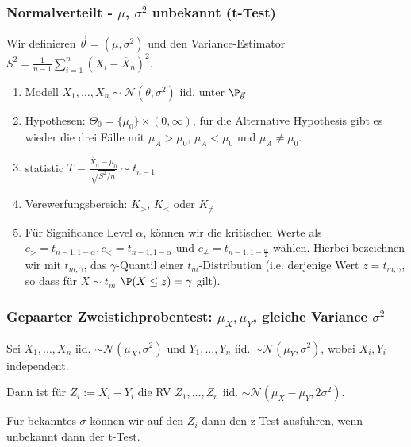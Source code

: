 \subsubsection*{\texorpdfstring{Normalverteilt - \(\mu\), \(\sigma^2\) unbekannt (t-Test)}{Normalverteilt - μ, σ² unbekannt (t-Test)}}
Wir definieren \(\vec{\theta} = (\mu, \sigma^2)\) und den Variance-Estimator \(S^2 = \frac{1}{n-1}\sum_{i=1}^n (X_i - \overline{X}_n)^2\).
\begin{enumerate}
	\item Modell \(X_1, \ldots, X_n \sim \mathcal{N}(\theta, \sigma^2)\) iid. unter \(\P_{\vec{\theta}}\)
	\item Hypothesen: $\Theta_0 = \{\mu_0\} \times (0, \infty)$, für die Alternative Hypothesis gibt es wieder die drei Fälle mit $\mu_A > \mu_0$, $\mu_A < \mu_0$ und $\mu_A \neq \mu_0$.
	\item statistic \(T = \frac{\overline{X}_n - \mu_0}{\sqrt{S^2/n}} \sim t_{n-1}\)
	\item Verewerfungsbereich: \(K_{>}\), \(K_{<}\) oder \(K_{\neq}\)
	\item Für Significance Level $\alpha$, können wir die kritischen Werte als $c_{>} = t_{n-1, 1-\alpha}, c_{<} = t_{n-1, 1- \alpha}$ und $c_{\neq} = t_{n-1, 1- \frac{\alpha}{2}}$ wählen.
	Hierbei bezeichnen wir mit $t_{m, \gamma}$, das $\gamma$-Quantil einer $t_m$-Distribution (i.e. derjenige Wert $z = t_{m, \gamma}$, so dass für $X \sim t_m$ $\P(X \leq z) = \gamma$ gilt).
\end{enumerate}
\subsubsection*{Gepaarter Zweistichprobentest: $\mu_X, \mu_Y$, gleiche Variance $\sigma^2$}
Sei $X_1, ..., X_n$ iid. $\sim \mathcal{N}(\mu_X, \sigma^2)$ und $Y_1, \dots, Y_n$ iid. $\sim \mathcal{N}(\mu_Y, \sigma^2)$, wobei $X_i, Y_i$ independent.

Dann ist für $Z_i := X_i - Y_i$ die RV $Z_1, \dots, Z_n$ iid. $\sim \mathcal{N}(\mu_X -\mu_Y, 2\sigma^2)$. 

Für bekanntes $\sigma$ können wir auf den $Z_i$ dann den z-Test ausführen, wenn unbekannt dann der t-Test.
